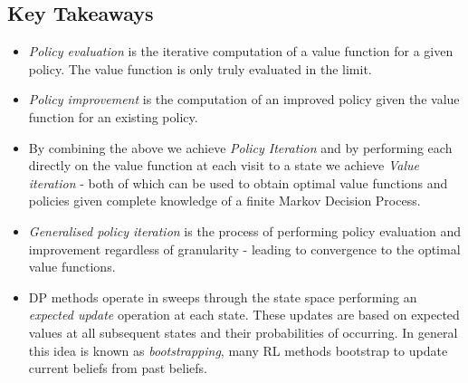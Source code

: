 \subsection{Key Takeaways}
\begin{itemize}
	\item \textit{Policy evaluation} is the iterative computation of a value function for a given policy. The value function is only truly evaluated in the limit.
	\item \textit{Policy improvement} is the computation of an improved policy given the value function for an existing policy.
	\item By combining the above we achieve \textit{Policy Iteration} and by performing each directly on the value function at each visit to a state we achieve \textit{Value iteration} - both of which can be used to obtain optimal value functions and policies given complete knowledge of a finite Markov Decision Process.
	\item \textit{Generalised policy iteration} is the process of performing policy evaluation and improvement regardless of granularity - leading to convergence to the optimal value functions.
	\item DP methods operate in sweeps through the state space performing an \textit{expected update} operation at each state. These updates are based on expected values at all subsequent states and their probabilities of occurring. In general this idea is known as \textit{bootstrapping}, many RL methods bootstrap to update current beliefs from past beliefs.
\end{itemize}
